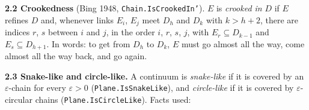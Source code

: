 \documentclass[11pt]{article}
\newcommand{\lean}[1]{\texttt{#1}}
\begin{document}
\textbf{2.2 Crookedness} (Bing 1948, \lean{Chain.\hspace{0pt}IsCrookedIn'}). $E$ is \emph{crooked in} $D$ if $E$ refines $D$ and, whenever links $E_i$, $E_j$ meet $D_h$ and $D_k$ with $k > h + 2$, there are indices $r$, $s$ between $i$ and $j$, in the order $i$, $r$, $s$, $j$, with $E_r \subseteq D_{k-1}$ and $E_s \subseteq D_{h+1}$. In words: to get from $D_h$ to $D_k$, $E$ must go almost all the way, come almost all the way back, and go again.

\textbf{2.3 Snake-like and circle-like.} A continuum is \emph{snake-like} if it is covered by an $\varepsilon$-chain for every $\varepsilon > 0$ (\lean{Plane.\hspace{0pt}IsSnakeLike}), and \emph{circle-like} if it is covered by $\varepsilon$-circular chains (\lean{Plane.\hspace{0pt}IsCircleLike}). Facts used:
\end{document}
